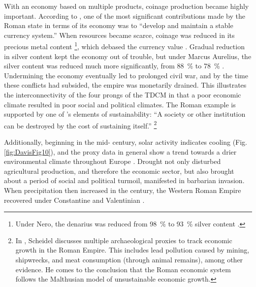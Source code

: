 

With an economy based on multiple products, coinage production became highly important. According to \textcite[49]{Kehoe_2013}, one of the most significant contributions made by the Roman state in terms of its economy was to “develop and maintain a stable currency system.” When resources became scarce, coinage was reduced in its precious metal content
\footnote{Under Nero, the denarius was reduced from \SI{98}{\percent} to \SI{93}{\percent} silver content \parencite[204]{Tainter_2014}.}, which debased the currency value \parencites[281]{Hichner_2009}[123--124]{Hopkins_1980}[274--275]{Ponting_2009}[204]{Tainter_2014}. Gradual reduction in silver content kept the economy out of trouble, but under Marcus Aurelius, the silver content was reduced much more significantly, from \SI{88}{\percent} to \SI{78}{\percent} \parencite[282]{Hichner_2009}. Undermining the economy eventually led to prolonged civil war, and by the time these conflicts had subsided, the empire was monetarily drained. This illustrates the interconnectivity of the four prongs of the TDCM in that a poor economic climate resulted in poor social and political climates. The Roman example is supported by one of \textcite[208]{Tainter_2014}'s elements of sustainability: “A society or other institution can be destroyed by the cost of sustaining itself.”
\footnote{In \textcite{Scheidel_2009b}, Scheidel discusses multiple archaeological proxies to track economic growth in the Roman Empire. This includes lead pollution caused by mining, shipwrecks, and meat consumption (through animal remains), among other evidence. He comes to the conclusion that the Roman economic system follows the Malthusian model of unsustainable economic growth.}

Additionally, beginning in the mid- century\AD, solar activity indicates cooling (Fig. \ref{fig:DavisFig10}), and the proxy data in general show a trend towards a drier environmental climate throughout Europe \parencite[185]{McCormick_2012}. Drought not only disturbed agricultural production, and therefore the economic sector, but also brought about a period of social and political turmoil, manifested in barbarian invasion. When precipitation then increased in the  century\AD, the Western Roman Empire recovered under Constantine and Valentinian \parencite[580]{Büntgen_2011a}.



